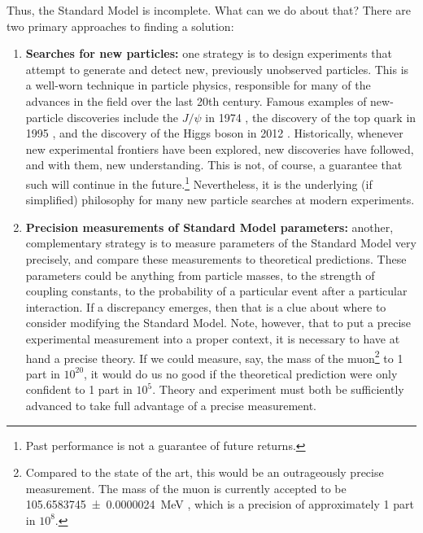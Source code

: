 \documentclass[../thesis.tex]{subfiles}
\begin{document}
	Thus, the Standard Model is incomplete. What can we do about that? There are two primary approaches to finding a solution:
	\begin{enumerate}
		\item \textbf{Searches for new particles:} one strategy is to design experiments that attempt to generate and detect new, previously unobserved particles. This is a well-worn technique in particle physics, responsible for many of the advances in the field over the last 20th century. Famous examples of new-particle discoveries include the $J/\psi$ in 1974 \cite{aubert_experimental_1974,augustin_discovery_1974}, the discovery of the top quark in 1995 \cite{d0_collaboration_observation_1995,cdf_collaboration_observation_1995}, and the discovery of the Higgs boson in 2012 \cite{atlas_collaboration_observation_2012,cms_collaboration_observation_2012}. Historically, whenever new experimental frontiers have been explored, new discoveries have followed, and with them, new understanding. This is not, of course, a guarantee that such will continue in the future.\footnote{Past performance is not a guarantee of future returns.} Nevertheless, it is the underlying (if simplified) philosophy for many new particle searches at modern experiments.

		\item \textbf{Precision measurements of Standard Model parameters:} another, complementary strategy is to measure parameters of the Standard Model very precisely, and compare these measurements to theoretical predictions. These parameters could be anything from particle masses, to the strength of coupling constants, to the probability of a particular event after a particular interaction. If a discrepancy emerges, then that is a clue about where to consider modifying the Standard Model. Note, however, that to put a precise experimental measurement into a proper context, it is necessary to have at hand a precise theory. If we could measure, say, the mass of the muon\footnote{Compared to the state of the art, this would be an outrageously precise measurement. The mass of the muon is currently accepted to be \SI{105.6583745(24)}{\mega\electronvolt} \cite{particle_data_group_review_2020}, which is a precision of approximately 1 part in $10^{8}$.} to 1 part in $10^{20}$, it would do us no good if the theoretical prediction were only confident to 1 part in $10^5$. Theory and experiment must both be sufficiently advanced to take full advantage of a precise measurement.
	\end{enumerate}
\end{document}
